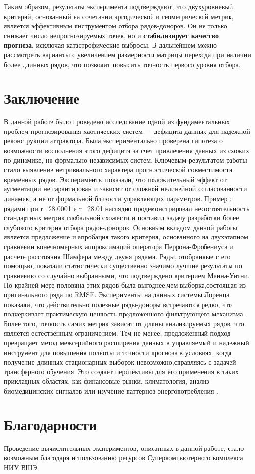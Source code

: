 \documentclass[a4paper,12pt]{extarticle}
\begin{document}
Таким образом, результаты эксперимента подтверждают, что двухуровневый критерий,
 основанный на сочетании эргодической и геометрической метрик, является 
 эффективным инструментом отбора рядов-доноров. Он не только снижает число непрогнозируемых 
 точек, но и \textbf{стабилизирует качество прогноза}, исключая катастрофические выбросы.
  В дальнейшем можно рассмотреть варианты с увеличением размерности матрицы перехода при наличии
   более длинных рядов, что позволит повысить точность первого уровня отбора.



\section{Заключение}

В данной работе было проведено исследование одной из фундаментальных проблем прогнозирования
 хаотических систем — дефицита данных для надежной реконструкции аттрактора. Была экспериментально
  проверена гипотеза о возможности восполнения этого дефицита за счет привлечения данных из схожих 
  по динамике, но формально независимых систем.
Ключевым результатом работы стало выявление нетривиального характера 
прогностической совместимости временных рядов. Эксперименты показали, 
что положительный эффект от аугментации не гарантирован и зависит от
 сложной нелинейной согласованности динамик, а не от формальной близости 
 управляющих параметров. Пример с рядами при 
r=28.0001 и 
r=28.01 наглядно продемонстрировал несостоятельность стандартных метрик
 глобальной схожести и поставил задачу разработки более глубокого критерия отбора рядов-доноров.
Основным вкладом данной работы является предложение и апробация такого 
критерия, основанного на двухэтапном сравнении конечномерных аппроксимаций оператора 
Перрона-Фробениуса и расчете расстояния Шамфера между двумя рядами. Ряды, отобранные с его помощью, показали 
статистически существенно значимо лучшие результаты по сравнению со случайно выбранными, что
 подтверждено критерием Манна-Уитни. По крайней мере половина этих рядов была выгоднее,чем  выборка,состоящая из оригинального ряда
  по RMSE. Эксперименты на данных системы
  Лоренца показали, что действительно полезные ряды-доноры встречаются редко, что подчеркивает практическую
   ценность предложенного фильтрующего механизма. Более того, точность самих метрик 
   зависит от длины анализируемых рядов, что является естественным ограничением. 
   Тем не менее, предложенный подход превращает метод межсерийного расширения данных
    в управляемый и надежный инструмент для повышения полноты и точности прогноза в
     условиях, когда получение длинных стационарных выборок невозможно,справляясь с задачей трансферного обучения.
    Это создает перспективы для его применения в таких прикладных областях, как
     финансовые рынки, климатология,
 анализ биомедицинских сигналов или изучение паттернов энергопотребления \cite{PerezChacon2018}.
\section{Благодарности}
Проведение вычислительных экспериментов, описанных в данной работе, стало
 возможным благодаря использованию ресурсов Суперкомпьютерного комплекса НИУ ВШЭ.

\newpage
\printbibliography[title={Список использованных источников}]
\end{document}
